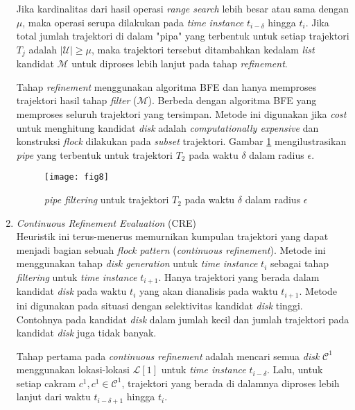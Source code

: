 \begin{enumerate}
\par Jika kardinalitas dari hasil operasi \textit{range search} lebih besar atau sama dengan $\mu$, maka operasi serupa dilakukan pada \textit{time instance} $t_{i-\delta}$ hingga $t_i$. Jika total jumlah trajektori di dalam "pipa" yang terbentuk untuk setiap trajektori $T_j$ adalah $|\mathcal{U}|\geq\mu$, maka trajektori tersebut ditambahkan kedalam \textit{list} kandidat $\mathcal{M}$ untuk diproses lebih lanjut pada tahap \textit{refinement}.

\par Tahap \textit{refinement} menggunakan algoritma BFE dan hanya memproses trajektori hasil tahap \textit{filter} ($\mathcal{M}$). Berbeda dengan algoritma BFE yang memproses seluruh trajektori yang tersimpan. Metode ini digunakan jika \textit{cost} untuk menghitung kandidat \textit{disk} adalah \textit{computationally expensive} dan konstruksi \textit{flock} dilakukan pada \textit{subset} trajektori. Gambar \ref{fig:fig8} mengilustrasikan \textit{pipe} yang terbentuk  untuk trajektori $T_2$ pada waktu $\delta$ dalam radius $\epsilon$.
\begin{figure}[H]
	\centering  
	\texttt{[image: fig8]}  
	\caption{\textit{pipe filtering} untuk trajektori $T_2$ pada waktu $\delta$ dalam radius $\epsilon$} 
	\label{fig:fig8} 
\end{figure} 

\item \textit{Continuous Refinement Evaluation} (CRE)\\
Heuristik ini terus-menerus memurnikan kumpulan trajektori yang dapat menjadi bagian sebuah \textit{flock pattern} (\textit{continuous refinement}). Metode ini menggunakan tahap \textit{disk generation} untuk \textit{time instance} $t_i$ sebagai tahap \textit{filtering} untuk \textit{time instance} $t_{i+1}$. Hanya trajektori yang berada dalam kandidat \textit{disk} pada waktu $t_i$ yang akan dianalisis pada waktu $t_{i+1}$. Metode ini digunakan pada situasi dengan selektivitas kandidat \textit{disk} tinggi. Contohnya pada kandidat \textit{disk} dalam jumlah kecil dan jumlah trajektori pada kandidat \textit{disk} juga tidak banyak.

\par Tahap pertama pada \textit{continuous refinement} adalah mencari semua \textit{disk} $\mathcal{C}^1$ menggunakan lokasi-lokasi $\mathcal{L}[1]$ untuk \textit{time instance} $t_{i-\delta}$. Lalu, untuk setiap cakram $c^1,c^1\in \mathcal{C}^1$, trajektori yang berada di dalamnya diproses lebih lanjut dari waktu $t_{i-\delta+1}$ hingga $t_i$.


\end{enumerate}

